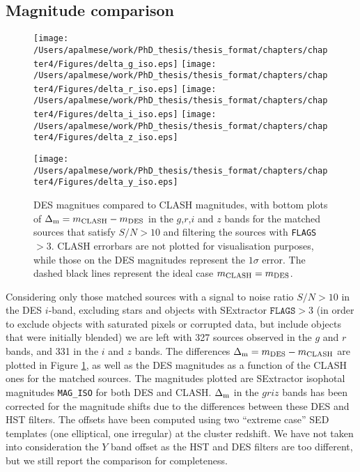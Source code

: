 {\subsection{Magnitude comparison}\label{magcomp}
\begin{figure}
\texttt{[image: /Users/apalmese/work/PhD\_thesis/thesis\_format/chapters/chapter4/Figures/delta\_g\_iso.eps]}\hskip -1cm \texttt{[image: /Users/apalmese/work/PhD\_thesis/thesis\_format/chapters/chapter4/Figures/delta\_r\_iso.eps]}
\texttt{[image: /Users/apalmese/work/PhD\_thesis/thesis\_format/chapters/chapter4/Figures/delta\_i\_iso.eps]}\hskip -1cm \texttt{[image: /Users/apalmese/work/PhD\_thesis/thesis\_format/chapters/chapter4/Figures/delta\_z\_iso.eps]}
\begin{center}
\texttt{[image: /Users/apalmese/work/PhD\_thesis/thesis\_format/chapters/chapter4/Figures/delta\_y\_iso.eps]}\end{center}
\caption{ DES magnitues compared to CLASH magnitudes, with bottom plots of $\Delta_{\rm m} =  m_{\rm CLASH} - m_{\rm DES}$ in the $g$,$r$,$i$ and $z$ bands for the matched sources that satisfy $S/N>10$ and filtering the sources with \texttt{FLAGS}$> 3$. CLASH errorbars are not plotted for visualisation purposes, while those on the DES magnitudes represent the $1\sigma$ error. The dashed black lines represent the ideal case $m_{\rm CLASH} = m_{\rm DES}$. }\label{deltamag}
\end{figure}
Considering only those matched sources with a signal to noise ratio $S/N>10$ in the DES $i$-band, excluding stars and objects with SExtractor $\texttt{FLAGS} > 3$ (in order to exclude objects with saturated pixels or corrupted data, but include objects that were initially blended) we are left with 327 sources observed in the $g$ and $r$ bands, and 331 in the $i$ and $z$ bands. The differences $\Delta_{\rm m} =  m_{\rm DES}- m_{\rm CLASH}$ are plotted in Figure \ref{deltamag}, as well as the DES magnitudes as a function of the CLASH ones for the matched sources. The magnitudes plotted are SExtractor isophotal magnitudes \texttt{MAG\_ISO} for both DES and CLASH. $\Delta_{\rm m}$ in the $griz$ bands has been corrected for the magnitude shifts due to the differences between these DES and HST filters. The offsets have been computed using two ``extreme case'' SED templates (one elliptical, one irregular) at the cluster redshift. We have not taken into consideration the $Y$ band offset as the HST and DES filters are too different, but we still report the comparison for completeness.

}
